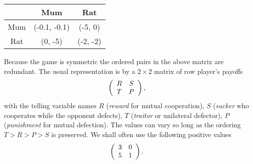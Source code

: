 \begin{center}
  \begin{tabular}{ | c | c | c | }
    \hline
    & Mum & Rat \\
    \hline
    Mum & (-0.1, -0.1) & (-5, 0) \\ \hline
    Rat & (0, -5) & (-2, -2)  \\ \hline
  \end{tabular}
\end{center}

Because the game is symmetric the ordered pairs in the above matrix are redundant. The usual representation is by a $2\times2$ matrix of row player's payoffs
\[
\left(
\begin{array}{c c}
R & S \\
T & P
\end{array}
\right)
,
\]
with the telling variable names $R$ (\textit{reward} for mutual cooperation), $S$ (\textit{sucker} who cooperates while the opponent defects), $T$ (\textit{traitor} or unilateral defector), $P$ (\textit{punishment} for mutual defection). The values can vary so long as the ordering $T > R > P > S$ is preserved. We shall often use the following positive values
\[
\left(
\begin{array}{c c}
3 & 0 \\
5 & 1
\end{array}
\right)
.\]


